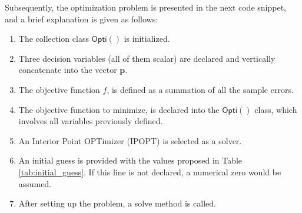 Subsequently, the optimization problem is presented in the next code snippet, and a brief explanation is given as follows:
\begin{enumerate}
  \itemsep0em 
  \item The collection class $\mathsf{Opti()}$ is initialized.
  \item Three decision variables (all of them scalar) are declared and vertically concatenate into the vector $\mathbf{p}$.
  \item The objective function $f$, is defined as a summation of all the sample errors.
  \item The objective function to minimize, is declared into the $\mathsf{Opti()}$ class, which involves all variables previously defined.
  \item An Interior Point OPTimizer (IPOPT) is selected as a solver.
  \item An initial guess is provided with the values proposed in Table \ref{tab:initial_guess}. If this line is not declared, a numerical zero would be assumed.
  \item After setting up the problem, a solve method is called. 

\end{enumerate}

